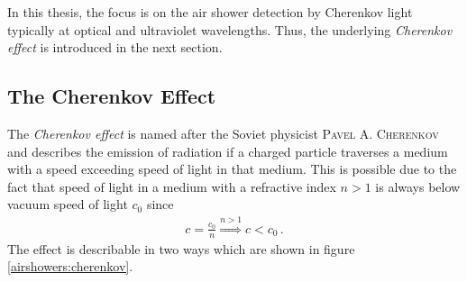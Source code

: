 In this thesis, the focus is on the air shower detection by Cherenkov light typically at optical and ultraviolet wavelengths. Thus, the underlying \textit{Cherenkov effect} is introduced in the next section.

\subsection{The Cherenkov Effect}\label{sec:intro:cherenkov}

The \textit{Cherenkov effect} is named after the Soviet physicist \textsc{Pavel A. Cherenkov} and describes the emission of radiation if a charged particle traverses a medium with a speed exceeding speed of light in that medium. \cite{airshowers:cherenkov} This is possible due to the fact that speed of light in a medium with a refractive index $n > 1$ is always below vacuum speed of light $c_0$ since
\begin{align}
	c = \frac{c_0}{n} \overset{n>1}{\Rightarrow} c < c_0\,.
\end{align} 
The effect is describable in two ways which are shown in figure \ref{airshowers:cherenkov}.
